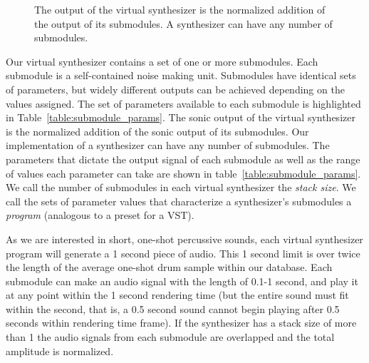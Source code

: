 \documentclass[\main/thesis.tex]{subfiles}
\begin{document}
 \begin{figure}[htbp]
    \begin{center}
    \end{center}
    \caption{The output of the virtual synthesizer is the normalized addition of the output of its submodules. A synthesizer can have any number of submodules. 
    }
\label{fig:synth_modules}
\end{figure}
Our virtual synthesizer contains a set of one or more submodules. Each submodule is a self-contained noise making unit. Submodules have identical sets of parameters, but widely different outputs can be achieved depending on the values assigned. The set of parameters available to each submodule is highlighted in Table~\ref{table:submodule_params}. The sonic output of the virtual synthesizer is the normalized addition of the sonic output of its submodules. Our implementation of a synthesizer can have any number of submodules. The parameters that dictate the output signal of each submodule as well as the range of values each parameter can take are shown in table~\ref{table:submodule_params}. We call the number of submodules in each virtual synthesizer the \textit{stack size}. We call the sets of parameter values that characterize a synthesizer's submodules a \textit{program} (analogous to a preset for a VST).  

As we are interested in short, one-shot percussive sounds, each virtual synthesizer program will generate a 1 second piece of audio. This 1 second limit is over twice the length of the average one-shot drum sample within our database. Each submodule can make an audio signal with the length of 0.1-1 second, and play it at any point within the 1 second rendering time (but the entire sound must fit within the second, that is, a 0.5 second sound cannot begin playing after 0.5 seconds within rendering time frame). If the synthesizer has a stack size of more than 1 the audio signals from each submodule are overlapped and the total amplitude is normalized.
\end{document}
